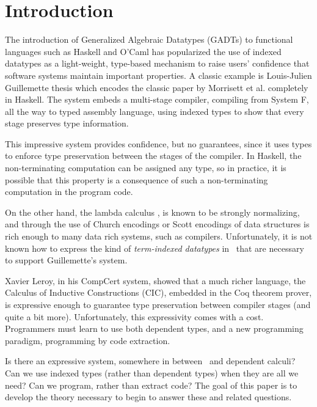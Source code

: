 \section{Introduction}
\label{sec:intro}


The introduction of Generalized Algebraic Datatypes (GADTs) to
functional languages such as Haskell and O'Caml has popularized
the use of indexed datatypes as a light-weight, type-based mechanism
to raise users' confidence that software systems maintain important properties.
A classic example is Louis-Julien Guillemette thesis\cite{guillemetteThesis}
which encodes the classic paper by Morrisett et al.\cite{tal-toplas} completely
in Haskell. The system embeds a multi-stage compiler, compiling from System F,
all the way to typed assembly language, using indexed types to show that
every stage preserves type information.

This impressive system provides confidence, but no guarantees, since it uses types to enforce
type preservation between the stages of the compiler. In Haskell, the non-terminating computation
can be assigned any type, so in practice, it is possible that this property is a consequence
of such a non-terminating computation in the program code.

On the other hand, the lambda calculus \Fw, is known to be strongly normalizing, and
through the use of Church encodings or Scott encodings of data structures is rich enough
to many data rich systems, such as compilers. Unfortunately, it is not known
how to express the kind of \emph{term-indexed datatypes} in \Fw\ that are necessary to
support Guillemette's system.

Xavier Leroy, in his CompCert system\cite{Leroy-Compcert-CACM}, showed that a much richer
language, the Calculus of Inductive Constructions (CIC), embedded in the Coq theorem prover,
is expressive enough to guarantee type preservation between compiler stages
(and quite a bit more). Unfortunately, this expressivity comes with a cost.
Programmers must learn to use both dependent types, and a new programming
paradigm, programming by code extraction.

Is there an expressive system, somewhere in between \Fw\ and dependent calculi?
Can we use indexed types (rather than dependent types) when they are all
we need? Can we program, rather than extract code?
The goal of this paper is to develop the theory necessary to begin to answer
these and related questions.

